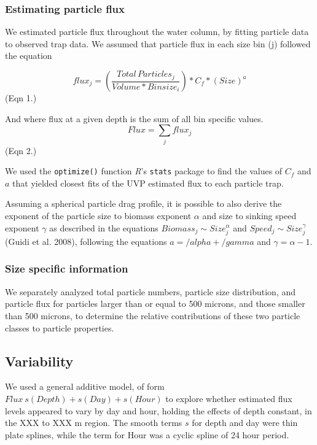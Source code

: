 \documentclass[]{article}
\begin{document}
\hypertarget{estimating-particle-flux}{%
\subsubsection{Estimating particle
flux}\label{estimating-particle-flux}}

We estimated particle flux throughout the water column, by fitting
particle data to observed trap data. We assumed that particle flux in
each size bin (j) followed the equation

\[flux_j =  (\frac{Total\,Particles_j}{Volume * Binsize_i}) * C_f * (Size) ^ a \]
(Eqn 1.)

And where flux at a given depth is the sum of all bin specific values.
\[Flux = \sum_j{flux_j}\] (Eqn 2.)

We used the \texttt{optimize()} function \emph{R}'s \texttt{stats}
package to find the values of \(C_f\) and \(a\) that yielded closest
fits of the UVP estimated flux to each particle trap.

Assuming a spherical particle drag profile, it is possible to also
derive the exponent of the particle size to biomass exponent \(\alpha\)
and size to sinking speed exponent \(\gamma\) as described in the
equations \(Biomass_j \sim Size_j^\alpha\) and
\(Speed_j \sim Size_j^\gamma\) (Guidi et al. 2008), following the
equations \(a = /alpha + /gamma\) and \(\gamma = \alpha -1\).

\hypertarget{size-specific-information}{%
\subsubsection{Size specific
information}\label{size-specific-information}}

We separately analyzed total particle numbers, particle size
distribution, and particle flux for particles larger than or equal to
500 microns, and those smaller than 500 microns, to determine the
relative contributions of these two particle classes to particle
properties.

\hypertarget{variability}{%
\subsection{Variability}\label{variability}}

We used a general additive model, of form
\(Flux ~ s(Depth) + s(Day) + s(Hour)\) to explore whether estimated flux
levels appeared to vary by day and hour, holding the effects of depth
constant, in the XXX to XXX m region. The smooth terms \(s\) for depth
and day were thin plate splines, while the term for Hour was a cyclic
spline of 24 hour period.
\end{document}
